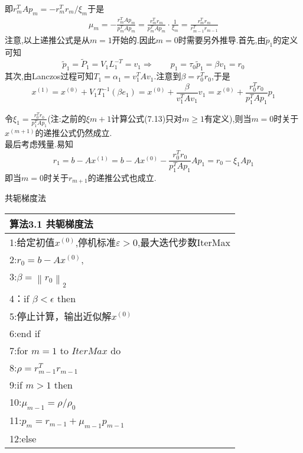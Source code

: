 \documentclass[notheorems,serif]{beamer}
\renewcommand{\normalsize}{\wuhao}
\newcommand{\wuhao}{\fontsize{10.5pt}{\baselineskip}\selectfont}
\begin{document}
\begin{frame}
即$r_{m}^{T} A p_{m}=-r_{m}^{T} r_{m} / \xi_{m}$于是
\begin{align*}
	\mu_{m}=-\frac{r_{m}^{T} A p_{m}}{p_{m}^{T} A p_{m}}=\frac{r_{m}^{T} r_{m}}{p_{m}^{T} A p_{m}} \cdot \frac{1}{\xi_{m}}=\frac{r_{m}^{T} r_{m}}{r_{m-1}^{T} r_{m-1}}
	\tag{7.14}
\end{align*}
注意,以上递推公式是从$m=1$开始的.因此$m=0$时需要另外推导.首先,由$\tilde{p}_{1}$的定义可知
$$
\tilde{p}_{1}=\tilde{P}_{1}=V_{1} L_{1}^{-T}=v_{1} \Longrightarrow \quad \quad p_{1}=\tau_{0} \tilde{p}_{1}=\beta v_{1}=r_{0}
$$
其次,由Lanczos过程可知$T_{1}=\alpha_{1}=v_{1}^{T} A v_{1}$.注意到$\beta=r_{0}^{T} r_{0}$,于是
$$
x^{(1)}=x^{(0)}+V_{1} T_{1}^{-1}\left(\beta e_{1}\right)=x^{(0)}+\frac{\beta}{v_{1}^{T} A v_{1}} v_{1}=x^{(0)}+\frac{r_{0}^{T} r_{0}}{p_{1}^{T} A p_{1}} p_{1}
$$
\end{frame}

\begin{frame}
令$\xi_{1}=\frac{r_{0}^{T} r_{0}}{p_{1}^{T} A p_{1}}$(注:之前的$\xi m+1$计算公式(7.13)只对$m \geq 1$有定义),则当$m=0$时关于$x^{(m+1)}$的递推公式仍然成立.\\
最后考虑残量.易知
$$
r_{1}=b-A x^{(1)}=b-A x^{(0)}-\frac{r_{0}^{T} r_{0}}{p_{1}^{T} A p_{1}} A p_{1}=r_{0}-\xi_{1} A p_{1}
$$
即当$m=0$时关于$r_{m+1}$的递推公式也成立.
\end{frame}


\begin{frame}


{\color{blue}\Large 共轭梯度法}

\quad

\normalsize
\begin{tabular}{l}
	\hline
	{\color{blue}算法3.1 共轭梯度法}\\
	\hline
	1:给定初值$x^{(0)}$,停机标准$\varepsilon>0$,最大迭代步数IterMax\\
	2:$r_{0}=b-A x^{(0)},$\\
	3:$\beta=\left\|r_{0}\right\|_{2}$\\
	4：if $\beta< \epsilon$ then\\
	5:\qquad 停止计算，输出近似解$x^{(0)}$\\
	6:end if\\
	7:for $m=1$ to $IterMax$ do\\
	8:\qquad $\rho=r_{m-1}^{T} r_{m-1}$\\
	9:\qquad if $m>1$ then\\
	10:\qquad \qquad $\mu_{m-1}=\rho / \rho_{0}$\\
	11:\qquad \qquad $p_{m}=r_{m-1}+\mu_{m-1} p_{m-1}$\\
	12:\qquad else\\
\end{tabular}
\end{frame}
\end{document}
